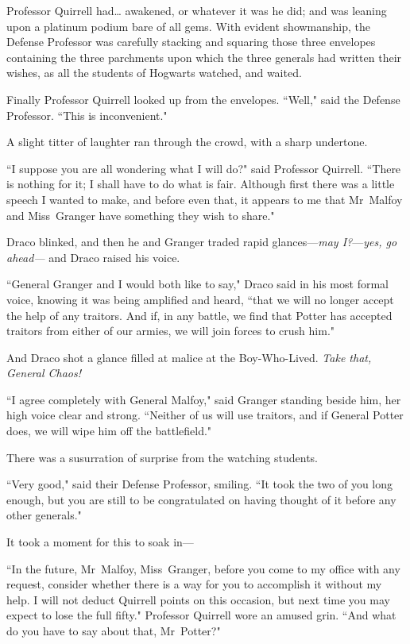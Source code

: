 Professor Quirrell had{\ldots} awakened, or whatever it was he did; and was leaning upon a platinum podium bare of all gems. With evident showmanship, the Defense Professor was carefully stacking and squaring those three envelopes containing the three parchments upon which the three generals had written their wishes, as all the students of Hogwarts watched, and waited.

Finally Professor Quirrell looked up from the envelopes. ``Well," said the Defense Professor. ``This is inconvenient."

A slight titter of laughter ran through the crowd, with a sharp undertone.

``I suppose you are all wondering what I will do?" said Professor Quirrell. ``There is nothing for it; I shall have to do what is fair. Although first there was a little speech I wanted to make, and before even that, it appears to me that Mr~Malfoy and Miss~Granger have something they wish to share."

Draco blinked, and then he and Granger traded rapid glances—\emph{may I?}—\emph{yes, go ahead—} and Draco raised his voice.

``General Granger and I would both like to say," Draco said in his most formal voice, knowing it was being amplified and heard, ``that we will no longer accept the help of any traitors. And if, in any battle, we find that Potter has accepted traitors from either of our armies, we will join forces to crush him."

And Draco shot a glance filled at malice at the Boy-Who-Lived. \emph{Take that, General Chaos!}

``I agree completely with General Malfoy," said Granger standing beside him, her high voice clear and strong. ``Neither of us will use traitors, and if General Potter does, we will wipe him off the battlefield."

There was a susurration of surprise from the watching students.

``Very good," said their Defense Professor, smiling. ``It took the two of you long enough, but you are still to be congratulated on having thought of it before any other generals."

It took a moment for this to soak in—

``In the future, Mr~Malfoy, Miss~Granger, before you come to my office with any request, consider whether there is a way for you to accomplish it without my help. I will not deduct Quirrell points on this occasion, but next time you may expect to lose the full fifty." Professor Quirrell wore an amused grin. ``And what do you have to say about that, Mr~Potter?"


